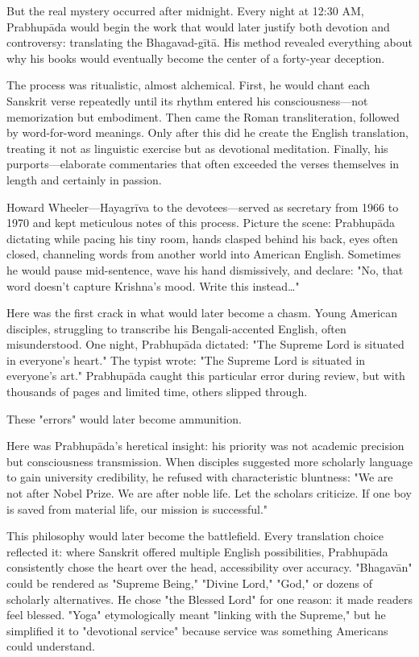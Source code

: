 \documentclass[12pt,twoside]{book}
\begin{document}
But the real mystery occurred after midnight. Every night at 12:30 AM, Prabhupāda would begin the work that would later justify both devotion and controversy: translating the Bhagavad-gītā. His method revealed everything about why his books would eventually become the center of a forty-year deception.

The process was ritualistic, almost alchemical. First, he would chant each Sanskrit verse repeatedly until its rhythm entered his consciousness—not memorization but embodiment. Then came the Roman transliteration, followed by word-for-word meanings. Only after this did he create the English translation, treating it not as linguistic exercise but as devotional meditation. Finally, his purports—elaborate commentaries that often exceeded the verses themselves in length and certainly in passion.

Howard Wheeler—Hayagrīva to the devotees—served as secretary from 1966 to 1970 and kept meticulous notes of this process. Picture the scene: Prabhupāda dictating while pacing his tiny room, hands clasped behind his back, eyes often closed, channeling words from another world into American English. Sometimes he would pause mid-sentence, wave his hand dismissively, and declare: "No, that word doesn't capture Krishna's mood. Write this instead\ldots{}"

Here was the first crack in what would later become a chasm. Young American disciples, struggling to transcribe his Bengali-accented English, often misunderstood. One night, Prabhupāda dictated: "The Supreme Lord is situated in everyone's heart." The typist wrote: "The Supreme Lord is situated in everyone's art." Prabhupāda caught this particular error during review, but with thousands of pages and limited time, others slipped through.

These "errors" would later become ammunition.

Here was Prabhupāda's heretical insight: his priority was not academic precision but consciousness transmission. When disciples suggested more scholarly language to gain university credibility, he refused with characteristic bluntness: "We are not after Nobel Prize. We are after noble life. Let the scholars criticize. If one boy is saved from material life, our mission is successful."

This philosophy would later become the battlefield. Every translation choice reflected it: where Sanskrit offered multiple English possibilities, Prabhupāda consistently chose the heart over the head, accessibility over accuracy. "Bhagavān" could be rendered as "Supreme Being," "Divine Lord," "God," or dozens of scholarly alternatives. He chose "the Blessed Lord" for one reason: it made readers feel blessed. "Yoga" etymologically meant "linking with the Supreme," but he simplified it to "devotional service" because service was something Americans could understand.
\end{document}
